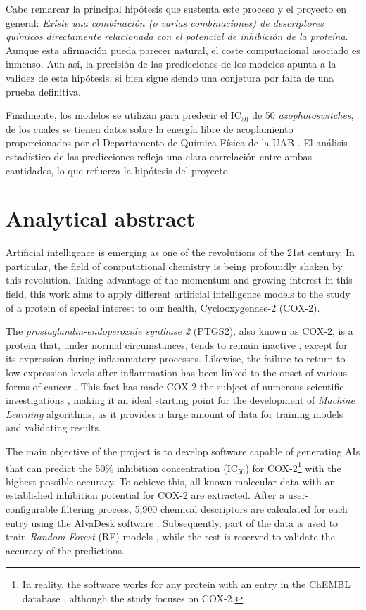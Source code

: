 \documentclass[11pt]{article}
\begin{document}
Cabe remarcar la principal hipótesis que sustenta este proceso y el proyecto en general: \emph{Existe una combinación (o varias combinaciones) de descriptores químicos directamente relacionada con el potencial de inhibición de la proteína}. Aunque esta afirmación pueda parecer natural, el coste computacional asociado es inmenso. Aun así, la precisión de las predicciones de los modelos apunta a la validez de esta hipótesis, si bien sigue siendo una conjetura por falta de una prueba definitiva.

Finalmente, los modelos se utilizan para predecir el IC$_{50}$ de 50 \emph{azophotoswitches}, de los cuales se tienen datos sobre la energía libre de acoplamiento proporcionados por el Departamento de Química Física de la UAB \cite{UAB_ComputationalChemistry}. El análisis estadístico de las predicciones refleja una clara correlación entre ambas cantidades, lo que refuerza la hipótesis del proyecto.

\newpage

\section*{Analytical abstract}
Artificial intelligence is emerging as one of the revolutions of the 21st century. In particular, the field of computational chemistry is being profoundly shaken by this revolution. Taking advantage of the momentum and growing interest in this field, this work aims to apply different artificial intelligence models to the study of a protein of special interest to our health, Cyclooxygenase-2 (COX-2).

The \emph{prostaglandin-endoperoxide synthase 2} (PTGS2), also known as COX-2, is a protein that, under normal circumstances, tends to remain inactive \cite{Cox2Location}, except for its expression during inflammatory processes. Likewise, the failure to return to low expression levels after inflammation has been linked to the onset of various forms of cancer \cite{DefinitionCOX2CancerDictionary}. This fact has made COX-2 the subject of numerous scientific investigations \cite{Cox2InhibitorsReview}, making it an ideal starting point for the development of \emph{Machine Learning} algorithms, as it provides a large amount of data for training models and validating results.

The main objective of the project is to develop software capable of generating AIs that can predict the 50\% inhibition concentration (IC$_{50}$) for COX-2\footnote{In reality, the software works for any protein with an entry in the ChEMBL database \cite{ChemblDatabase}, although the study focuses on COX-2.} with the highest possible accuracy. To achieve this, all known molecular data with an established inhibition potential for COX-2 are extracted. After a user-configurable filtering process, 5,900 chemical descriptors are calculated for each entry using the AlvaDesk software \cite{MauriMolecularDescriptorsBook}\cite{AlvaDescSecondPaper}. Subsequently, part of the data is used to train \emph{Random Forest} (RF) models \cite{MachineLearningRandomForest}, while the rest is reserved to validate the accuracy of the predictions.
\end{document}

